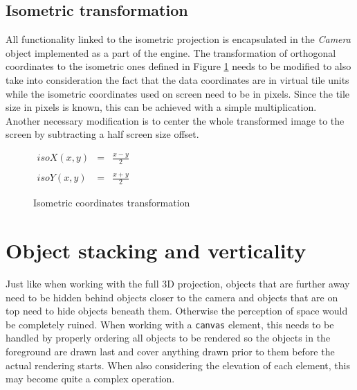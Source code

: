 \documentclass[11pt,oneside, final]{fithesis2}
\begin{document}
\subsection{Isometric transformation}
All functionality linked to the isometric projection is encapsulated in the \emph{Camera} object implemented as a part of the engine. The transformation of orthogonal coordinates to the isometric ones defined in Figure \ref{isotransformation} needs to be modified to also take into consideration the fact that the data coordinates are in virtual tile units while the isometric coordinates used on screen need to be in pixels\cite{pagella}. Since the tile size in pixels is known, this can be achieved with a simple multiplication. Another necessary modification is to center the whole transformed image to the screen by subtracting a half screen size offset.

\begin{figure}[h]
	\centering
	\begin{math}
		\begin{array}{lcl}
			isoX(x,y)&=&\frac{x - y}{2} \\\\
			isoY(x,y)&=&\frac{x + y}{2}
		\end{array}
	\end{math}
	\caption{Isometric coordinates transformation}
	\label{isotransformation}
\end{figure}

\section{Object stacking and verticality}
Just like when working with the full 3D projection, objects that are further away need to be hidden behind objects closer to the camera and objects that are on top need to hide objects beneath them. Otherwise the perception of space would be completely ruined. When working with a \texttt{canvas} element, this needs to be handled by properly ordering all objects to be rendered so the objects in the foreground are drawn last and cover anything drawn prior to them before the actual rendering starts. When also considering the elevation of each element, this may become quite a complex operation. 
\end{document}
